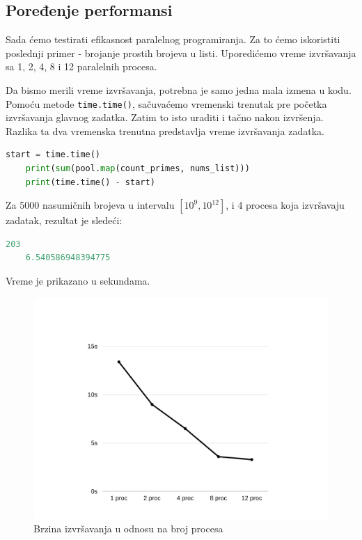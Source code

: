 \documentclass[a4paper]{article}
\begin{document}
    \subsection{Poređenje performansi}
    Sada ćemo testirati efikasnost paralelnog programiranja. Za to ćemo iskoristiti poslednji primer - brojanje prostih brojeva u listi. Uporedićemo vreme izvršavanja sa 1, 2, 4, 8 i 12 paralelnih procesa.
    \par Da bismo merili vreme izvršavanja, potrebna je samo jedna mala izmena u kodu. Pomoću metode \lstinline{time.time()}, sačuvaćemo vremenski trenutak pre početka izvršavanja glavnog zadatka. Zatim to isto uraditi i tačno nakon izvršenja. Razlika ta dva vremenska trenutna predstavlja vreme izvršavanja zadatka.
    \begin{lstlisting}[showstringspaces=false, language=Python]
    start = time.time()
    print(sum(pool.map(count_primes, nums_list)))
    print(time.time() - start)
    \end{lstlisting}
    Za 5000 nasumičnih brojeva u intervalu $\left [ 10^{9}, 10^{12} \right ]$, i 4 procesa koja izvršavaju zadatak, rezultat je sledeći:
    \begin{lstlisting}[showstringspaces=false, language=Python]
    203
    6.540586948394775
    \end{lstlisting}
    \par Vreme je prikazano u sekundama. \\
  
    \begin{figure}[ht!]
    \begin{center}
    \includegraphics{grafik.png}
    \end{center}
    \caption{Brzina izvršavanja u odnosu na broj procesa}
    \label{fig:grafik}
    \end{figure}
    
\end{document}
